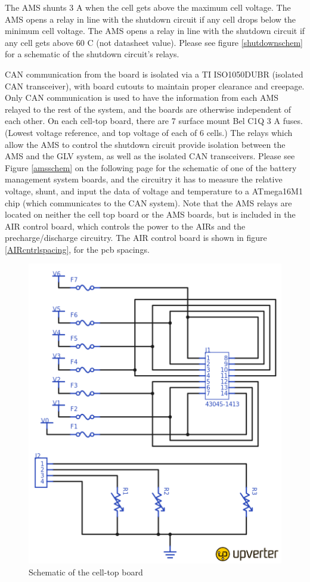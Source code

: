 \documentclass{article}
\begin{document}
    The AMS shunts 3 A when the cell gets above the maximum cell voltage. The AMS opens a relay in line with the shutdown circuit if any cell drops below the minimum cell voltage. The AMS opens a relay in line with the shutdown circuit if any cell gets above 60 \degree C (not datasheet value). Please see figure \ref{shutdownschem} for a schematic of the shutdown circuit's relays.

    CAN communication from the board is isolated via a TI ISO1050DUBR (isolated CAN transceiver), with board cutouts to maintain proper clearance and creepage. Only CAN communication is used to have the information from each AMS relayed to the rest of the system, and the boards are otherwise independent of each other. On each cell-top board, there are 7 surface mount Bel C1Q 3 A fuses. (Lowest voltage reference, and top voltage of each of 6 cells.) The relays which allow the AMS to control the shutdown circuit provide isolation between the AMS and the GLV system, as well as the isolated CAN transceivers. Please see Figure \ref{amsschem} on the following page for the schematic of one of the battery management system boards, and the circuitry it has to measure the relative voltage, shunt, and input the data of voltage and temperature to a ATmega16M1 chip (which communicates to the CAN system). Note that the AMS relays are located on neither the cell top board or the AMS boards, but is included in the AIR control board, which controls the power to the AIRs and the precharge/discharge circuitry. The AIR control board is shown in figure \ref{AIRcntrlspacing}, for the pcb spacings. %


        \begin{figure}[H]
            \centering
            \includegraphics[width = 0.4 \textwidth]{celltopschem}
            \caption{Schematic of the cell-top board}
            \label{celltopschem}
        \end{figure}
\end{document}

